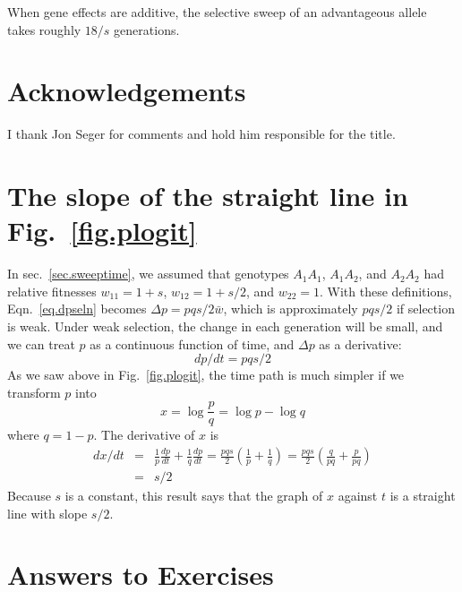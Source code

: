 \documentclass[11pt]{article}
\begin{document}
When gene effects are additive, the selective sweep of an advantageous
allele takes roughly $18/s$ generations.

\section*{Acknowledgements} I thank Jon Seger for comments and hold
him responsible for the title.

\appendix

\section{The slope of the straight line in Fig.~\ref{fig.plogit}}
\label{sec.slope}
In sec.~\ref{sec.sweeptime}, we assumed that genotypes $A_1A_1$,
$A_1A_2$, and $A_2A_2$ had relative fitnesses $w_{11} = 1+s$, $w_{12}
= 1+s/2$, and $w_{22} = 1$. With these definitions,
Eqn.~\ref{eq.dpseln} becomes $\Delta p = pqs/2\bar w$, which is
approximately $pqs/2$ if selection is weak. Under weak selection, the
change in each generation will be small, and we can treat $p$ as a
continuous function of time, and $\Delta p$ as a derivative:
\[
  dp/dt = pqs/2
\]
As we saw above in Fig.~\ref{fig.plogit}, the time path is much
simpler if we transform $p$ into
\[
x = \log \frac{p}{q} = \log p - \log q
\]
where $q = 1 - p$. The derivative of $x$ is
\begin{eqnarray*}
  dx/dt &=& \frac{1}{p} \frac{dp}{dt} + \frac{1}{q}\frac{dp}{dt}
  =\frac{pqs}{2}\left(\frac{1}{p} + \frac{1}{q}\right)
  =\frac{pqs}{2}\left(\frac{q}{pq} + \frac{p}{pq}\right)\\
  &=& s/2
\end{eqnarray*}  
Because $s$ is a constant, this result says that the graph of $x$
against $t$ is a straight line with slope $s/2$.


\section{Answers to Exercises}
\listanswers



\end{document}
